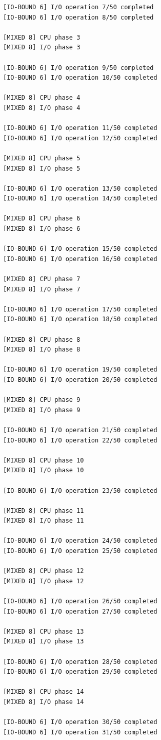 \documentclass[a4paper,12pt]{report}
\begin{document}
\begin{tcolorbox}[colback=black!5, colframe=green!60, title=\textbf{Live XV6 MLFQ Test Execution}]
\begin{lstlisting}[basicstyle=\ttfamily\tiny, breaklines=true, backgroundcolor=\color{black!5}]
[IO-BOUND 6] I/O operation 7/50 completed
[IO-BOUND 6] I/O operation 8/50 completed

[MIXED 8] CPU phase 3
[MIXED 8] I/O phase 3

[IO-BOUND 6] I/O operation 9/50 completed
[IO-BOUND 6] I/O operation 10/50 completed

[MIXED 8] CPU phase 4
[MIXED 8] I/O phase 4

[IO-BOUND 6] I/O operation 11/50 completed
[IO-BOUND 6] I/O operation 12/50 completed

[MIXED 8] CPU phase 5
[MIXED 8] I/O phase 5

[IO-BOUND 6] I/O operation 13/50 completed
[IO-BOUND 6] I/O operation 14/50 completed

[MIXED 8] CPU phase 6
[MIXED 8] I/O phase 6

[IO-BOUND 6] I/O operation 15/50 completed
[IO-BOUND 6] I/O operation 16/50 completed

[MIXED 8] CPU phase 7
[MIXED 8] I/O phase 7

[IO-BOUND 6] I/O operation 17/50 completed
[IO-BOUND 6] I/O operation 18/50 completed

[MIXED 8] CPU phase 8
[MIXED 8] I/O phase 8

[IO-BOUND 6] I/O operation 19/50 completed
[IO-BOUND 6] I/O operation 20/50 completed

[MIXED 8] CPU phase 9
[MIXED 8] I/O phase 9

[IO-BOUND 6] I/O operation 21/50 completed
[IO-BOUND 6] I/O operation 22/50 completed

[MIXED 8] CPU phase 10
[MIXED 8] I/O phase 10

[IO-BOUND 6] I/O operation 23/50 completed

[MIXED 8] CPU phase 11
[MIXED 8] I/O phase 11

[IO-BOUND 6] I/O operation 24/50 completed
[IO-BOUND 6] I/O operation 25/50 completed

[MIXED 8] CPU phase 12
[MIXED 8] I/O phase 12

[IO-BOUND 6] I/O operation 26/50 completed
[IO-BOUND 6] I/O operation 27/50 completed

[MIXED 8] CPU phase 13
[MIXED 8] I/O phase 13

[IO-BOUND 6] I/O operation 28/50 completed
[IO-BOUND 6] I/O operation 29/50 completed

[MIXED 8] CPU phase 14
[MIXED 8] I/O phase 14

[IO-BOUND 6] I/O operation 30/50 completed
[IO-BOUND 6] I/O operation 31/50 completed


\end{lstlisting}
\end{tcolorbox}
\end{document}
